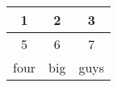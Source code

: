 \begin{center}
\begin{tabular}{|c|c|c|}
\hline
1 & 2 & 3\\
\hline
5 & 6 & 7\\
\hline
four & big & guys\\
\hline
\end{tabular}
\end{center}